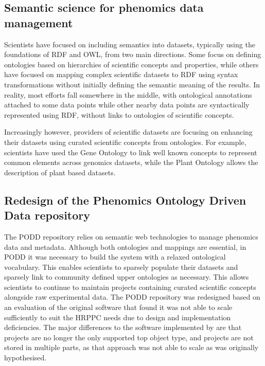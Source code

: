 \documentclass{llncs}
\begin{document}
\subsection{Semantic science for phenomics data management}
Scientists have focused on including semantics into datasets, typically using
the foundations of RDF and OWL, from two main directions. Some focus on defining
ontologies based on hierarchies of scientific concepts and properties, while
others have focused on mapping complex scientific datasets to RDF using syntax
transformations without initially defining the semantic meaning of the results.
In reality, most efforts fall somewhere in the middle, with ontological
annotations attached to some data points while other nearby data points are
syntactically represented using RDF, without links to ontologies of scientific
concepts.


Increasingly however, providers of scientific datasets are focusing on enhancing
their datasets using curated scientific concepts from ontologies. For example,
scientists have used the Gene Ontology \cite{Ashburner2000} to link well known concepts to
represent common elements across genomics datasets, while the Plant Ontology \cite{Avraham2008} 
allows the description of plant based datasets. 


\subsection{Redesign of the Phenomics Ontology Driven Data repository}
The PODD repository relies on semantic web technologies to
manage phenomics data and metadata. Although both ontologies and mappings are
essential, in PODD it was necessary to build the system with a relaxed
ontological vocabulary. This enables scientists to sparsely populate their datasets 
and sparsely link to community defined upper ontologies as necessary. This 
allows scientists to continue to maintain projects containing curated
scientific concepts alongside raw experimental data. The PODD repository was 
redesigned based on an evaluation of the original software \cite{Li2010} that 
found it was not able to scale sufficiently to suit the HRPPC needs due to design 
and implementation deficiencies. The major differences to the software implemented 
by \cite{Li2010} are that projects are no longer the only supported top object type, 
and projects are not stored in multiple parts, as that approach was not able to 
scale as was originally hypothesised.
\end{document}
